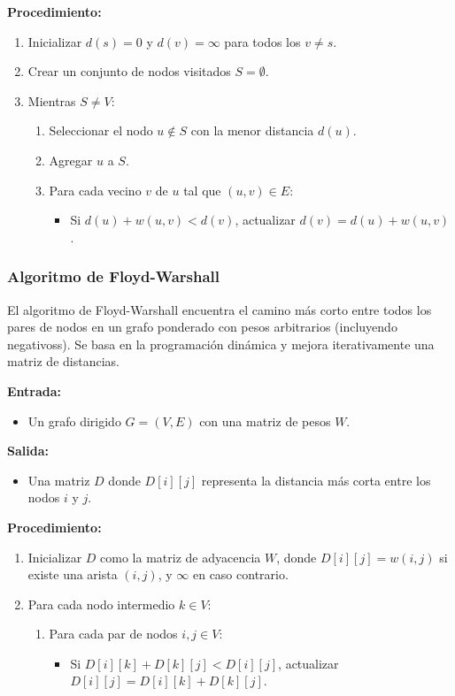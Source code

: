 \documentclass[openany]{book}
\begin{document}
			\textbf{Procedimiento:}
			\begin{enumerate}
				\item Inicializar $d(s) = 0$ y $d(v) = \infty$ para todos los $v \neq s$.
				\item Crear un conjunto de nodos visitados $S = \emptyset$.
				\item Mientras $S \neq V$:
				\begin{enumerate}
					\item Seleccionar el nodo $u \notin S$ con la menor distancia $d(u)$.
					\item Agregar $u$ a $S$.
					\item Para cada vecino $v$ de $u$ tal que $(u,v) \in E$:
					\begin{itemize}
						\item Si $d(u) + w(u,v) < d(v)$, actualizar $d(v) = d(u) + w(u,v)$.
					\end{itemize}
				\end{enumerate}
			\end{enumerate}

			\subsubsection{Algoritmo de Floyd-Warshall}

			El algoritmo de Floyd-Warshall encuentra el camino más corto entre todos los pares de nodos en un grafo ponderado con pesos arbitrarios (incluyendo negativoss). Se basa en la programación dinámica y mejora iterativamente una matriz de distancias.

			\textbf{Entrada:}
			\begin{itemize}
				\item Un grafo dirigido $G = (V, E)$ con una matriz de pesos $W$.
			\end{itemize}

			\textbf{Salida:}
			\begin{itemize}
				\item Una matriz $D$ donde $D[i][j]$ representa la distancia más corta entre los nodos $i$ y $j$.
			\end{itemize}

			\textbf{Procedimiento:}
			\begin{enumerate}
				\item Inicializar $D$ como la matriz de adyacencia $W$, donde $D[i][j] = w(i,j)$ si existe una arista $(i,j)$, y $\infty$ en caso contrario.
				\item Para cada nodo intermedio $k \in V$:
				\begin{enumerate}
					\item Para cada par de nodos $i, j \in V$:
					\begin{itemize}
						\item Si $D[i][k] + D[k][j] < D[i][j]$, actualizar $D[i][j] = D[i][k] + D[k][j]$.
					\end{itemize}
				\end{enumerate}
			\end{enumerate}
\end{document}
